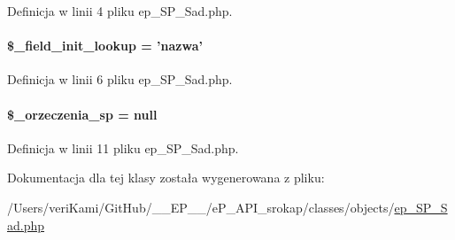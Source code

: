 Definicja w linii 4 pliku ep\-\_\-\-S\-P\-\_\-\-Sad.\-php.

\hypertarget{classep___s_p___sad_a4a4d54ae35428077a7c61ec8a5139af3}{
\paragraph[{\$\-\_\-field\-\_\-init\-\_\-lookup}]{\setlength{\rightskip}{0pt plus 5cm}\$\-\_\-field\-\_\-init\-\_\-lookup = 'nazwa'}}\label{classep___s_p___sad_a4a4d54ae35428077a7c61ec8a5139af3}


Definicja w linii 6 pliku ep\-\_\-\-S\-P\-\_\-\-Sad.\-php.

\hypertarget{classep___s_p___sad_a460ae26a90178f807b8ccda9dcbc90a4}{
\paragraph[{\$\-\_\-orzeczenia\-\_\-sp}]{\setlength{\rightskip}{0pt plus 5cm}\$\-\_\-orzeczenia\-\_\-sp = null\hspace{0.3cm}{\ttfamily [protected]}}}\label{classep___s_p___sad_a460ae26a90178f807b8ccda9dcbc90a4}


Definicja w linii 11 pliku ep\-\_\-\-S\-P\-\_\-\-Sad.\-php.



Dokumentacja dla tej klasy została wygenerowana z pliku\-:\begin{DoxyCompactItemize}
\item 
/\-Users/veri\-Kami/\-Git\-Hub/\-\_\-\-\_\-\-E\-P\-\_\-\-\_\-/e\-P\-\_\-\-A\-P\-I\-\_\-srokap/classes/objects/\hyperlink{ep___s_p___sad_8php}{ep\-\_\-\-S\-P\-\_\-\-Sad.\-php}\end{DoxyCompactItemize}
